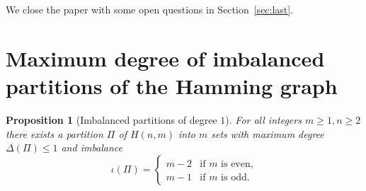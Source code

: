 \documentclass[a4paper,10pt]{amsart}
\newtheorem{prop}[thm]{Proposition}
\begin{document}
We close the paper with some open questions in Section~\ref{sec:last}.

\section{Maximum degree of imbalanced partitions of the Hamming graph}


\begin{prop}[{\sf Imbalanced partitions of degree $1$}]
\label{prop:FirstConstruction}
For all integers $m\geq 1, n\geq 2$ there exists a partition $\Pi$ of $H(n,m)$ into $m$ sets with maximum degree $\Delta(\Pi)\leq 1$ and imbalance \[\iota(\Pi)= \begin{cases} m-2 & \text{if } m \text{ is even,}\\
m-1 & \text{if } m \text{ is odd.}\end{cases}\]
\end{prop}
\end{document}
